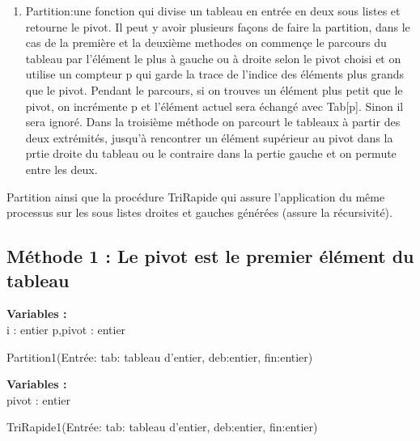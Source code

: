 \begin{enumerate}
    \item Partition:une fonction qui divise un tableau en entrée en deux sous listes et retourne le pivot. Il peut y avoir plusieurs façons de faire la partition, dans le cas de la première et la deuxième methodes  on commençe le parcours du tableau par l'élément le plus à gauche ou à droite selon le pivot choisi et on utilise un compteur p qui garde la trace de l'indice des éléments plus grands que le pivot. Pendant le parcours, si on trouves un élément plus petit que le pivot, on incrémente p et l'élément actuel sera échangé avec Tab[p]. Sinon il sera ignoré.
    Dans la troisième méthode on parcourt le tableaux à partir des deux extrémités, jusqu'à rencontrer un élément supérieur au pivot dans la prtie droite du tableau ou le contraire dans la pertie gauche et on permute entre les deux.
\end{enumerate}
Partition  ainsi que la procédure TriRapide qui assure l'application du 
même processus sur les sous listes droites et gauches générées (assure la récursivité).\\
\subsection{Méthode 1 : Le pivot est le premier élément du tableau }
\par
\begin{function}[H]
    \textbf{Variables :}\\
     i : entier\;
     p,pivot : entier\;
    \caption{Partition1(Entrée: tab: tableau d'entier, deb:entier, fin:entier)}
\end{function}

\par
\begin{function}[H]
    \textbf{Variables :}\\
     pivot : entier\;
    \caption{TriRapide1(Entrée: tab: tableau d'entier, deb:entier, fin:entier)}
\end{function}

